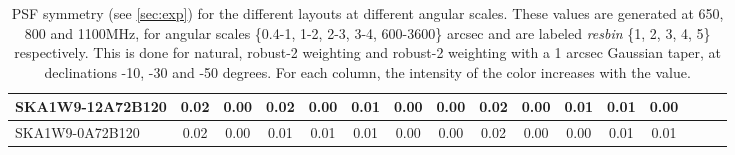 \begin{table}[!htp]
{{\begin{tabular}{|lccccc||ccccc||ccccc|}
SKA1W9-12A72B120 & 0.02 \cellcolor{blue!18.00} & 0.00 \cellcolor{red!18.00} & 0.02 \cellcolor{green!32.00} & 0.00 \cellcolor{orange!18.00} & 0.01 \cellcolor{blue!18.00} & 0.00 \cellcolor{red!18.00} & 0.00 \cellcolor{green!18.00} & 0.02 \cellcolor{orange!18.00} & 0.00 \cellcolor{blue!18.00} & 0.01 \cellcolor{red!28.50} & 0.01 \cellcolor{green!18.00} & 0.00 \cellcolor{orange!18.00}\\ \hline 
SKA1W9-0A72B120 & 0.02 \cellcolor{blue!18.00} & 0.00 \cellcolor{red!18.00} & 0.01 \cellcolor{green!18.00} & 0.01 \cellcolor{orange!60.00} & 0.01 \cellcolor{blue!18.00} & 0.00 \cellcolor{red!18.00} & 0.00 \cellcolor{green!18.00} & 0.02 \cellcolor{orange!18.00} & 0.00 \cellcolor{blue!18.00} & 0.00 \cellcolor{red!18.00} & 0.01 \cellcolor{green!18.00} & 0.01 \cellcolor{orange!60.00}\tabularnewline \hline 
\end{tabular}}\hfil 

\caption{PSF symmetry (see \autoref{sec:exp})  for the different layouts at different angular scales. These values are generated at 650, 800 and 1100MHz, for angular scales \{0.4-1, 1-2, 2-3, 3-4, 600-3600\} arcsec and are labeled {\it resbin} \{1, 2, 3, 4, 5\} respectively. This is done for natural, robust-2 weighting and robust-2 weighting with a 1 arcsec Gaussian taper, at declinations -10, -30 and -50 degrees. For each column, the intensity of the color increases with the value.}\label{tab:psf_sym}}
 \end{table}